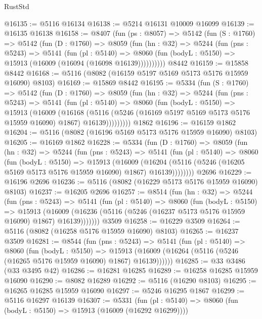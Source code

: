 \begin{lexlean}{RustStd}
\begin{coremodule}
@16135 := @5116 @16134
@16138 := @5214 @16131 @10009 @16099
@16139 := @16135 @16138
@16158 := @8407
    (fun (ps : @8057) =>
    @5142
      (fun (S : @1760) =>
      @5142
        (fun (D : @1760) =>
        @8059
          (fun (hn : @32) =>
          @5244
            (fun (pns : @5243) =>
            @5141
              (fun (pl : @5140) =>
              @8060 (fun (bodyL : @5150) => @15913 (@16009 (@16094 (@16098 @16139))))))))))
    @8442
@16159 := @15858 @8442
@16168 := @5116 (@8082 (@16159 @5197 @5169 @5173 @5176 @15959 @16090) @8103)
@16169 := @15869 @8442
@16195 := @5334
    (fun (S : @1760) =>
    @5142
      (fun (D : @1760) =>
      @8059
        (fun (hn : @32) =>
        @5244
          (fun (pns : @5243) =>
          @5141
            (fun (pl : @5140) =>
            @8060
              (fun (bodyL : @5150) =>
              @15913
                (@16009
                  (@16168
                    (@5116
                      (@5246 (@16169 @5197 @5169 @5173 @5176 @15959 @16090) @1867)
                      @16139)))))))))
    @1862
@16196 := @16159 @1862
@16204 := @5116 (@8082 (@16196 @5169 @5173 @5176 @15959 @16090) @8103)
@16205 := @16169 @1862
@16228 := @5334
    (fun (D : @1760) =>
    @8059
      (fun (hn : @32) =>
      @5244
        (fun (pns : @5243) =>
        @5141
          (fun (pl : @5140) =>
          @8060
            (fun (bodyL : @5150) =>
            @15913
              (@16009
                (@16204 (@5116 (@5246 (@16205 @5169 @5173 @5176 @15959 @16090) @1867) @16139))))))))
    @2696
@16229 := @16196 @2696
@16236 := @5116 (@8082 (@16229 @5173 @5176 @15959 @16090) @8103)
@16237 := @16205 @2696
@16257 := @8514
    (fun (hn : @32) =>
    @5244
      (fun (pns : @5243) =>
      @5141
        (fun (pl : @5140) =>
        @8060
          (fun (bodyL : @5150) =>
          @15913
            (@16009 (@16236 (@5116 (@5246 (@16237 @5173 @5176 @15959 @16090) @1867) @16139)))))))
    @3509
@16258 := @16229 @3509
@16264 := @5116 (@8082 (@16258 @5176 @15959 @16090) @8103)
@16265 := @16237 @3509
@16281 := @8544
    (fun (pns : @5243) =>
    @5141
      (fun (pl : @5140) =>
      @8060
        (fun (bodyL : @5150) =>
        @15913 (@16009 (@16264 (@5116 (@5246 (@16265 @5176 @15959 @16090) @1867) @16139))))))
@16285 := @33 @3486 (@33 @3495 @42)
@16286 := @16281 @16285
@16289 := @16258 @16285 @15959 @16090
@16290 := @8082 @16289
@16292 := @5116 (@16290 @8103)
@16295 := @16265 @16285 @15959 @16090
@16297 := @5246 @16295 @1867
@16299 := @5116 @16297 @16139
@16307 := @5331
    (fun (pl : @5140) => @8060 (fun (bodyL : @5150) => @15913 (@16009 (@16292 @16299))))

\end{coremodule}
\end{lexlean}
